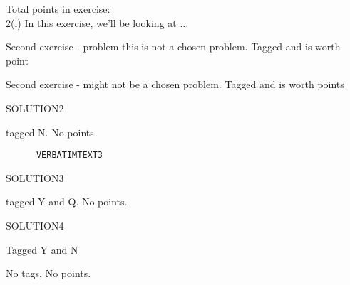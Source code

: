 \begin{intro}
	Total points in exercise: \exercisepoints\\
	2(i) In this exercise, we'll be looking at \( \dots \)
\end{intro}
\begin{problem}
  Second exercise - problem this is not a chosen problem. \makeatletter Tagged \exb@currentTags and is worth  \exb@currentPoints\makeatother point
\end{problem}
\begin{problem}
  Second exercise - might not be a chosen problem. \makeatletter Tagged \exb@currentTags and is worth \exb@currentPoints points\makeatother
\end{problem}
\begin{solution}
	SOLUTION2
\end{solution}
\resetnextproblems
{}
\begin{problem}
  \lipsum[1] tagged N. No points
\begin{verbatim}
      VERBATIMTEXT3
  \end{verbatim}
\end{problem}
\begin{solution}
	SOLUTION3
\end{solution}
\begin{problem}
tagged Y and Q. No points. \lipsum[2-3]
\end{problem}
\begin{solution}
	SOLUTION4
\end{solution}
\begin{problem}
\lipsum[4] Tagged Y and N
\end{problem}
\begin{problem}
\lipsum[4] No tags, No points.
\end{problem}
